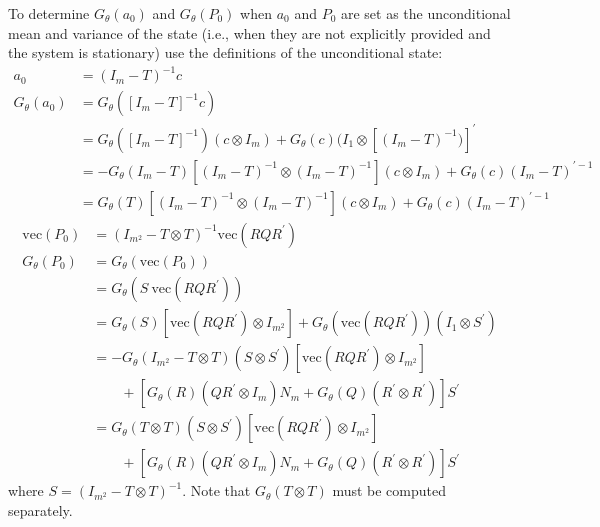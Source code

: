 \documentclass[12pt]{article}
\newcommand{\Gt}{G_\theta}
\newcommand{\vecop}[0]{\text{vec}}
\begin{document}
To determine $\Gt(a_0)$ and $\Gt(P_0)$ when $a_0$ and $P_0$ are set as the unconditional mean and variance of the state (i.e., when they are not explicitly provided and the system is stationary) use the definitions of the unconditional state:
\begin{align*}
a_0 &= (I_m - T)^{-1} c \\
\Gt(a_0) &= \Gt([I_m - T]^{-1} c) \\ 
	&= \Gt([I_m - T]^{-1}) (c \otimes I_m) + \Gt(c) (I_1 \otimes [(I_m - T)^{-1})]^\prime \\ 
	&= -\Gt(I_m - T) [(I_m - T)^{-1} \otimes (I_m - T)^{-1} ](c \otimes I_m) +  \Gt(c) (I_m - T)^{\prime-1} \\ 
	&= \Gt(T) [(I_m - T)^{-1} \otimes (I_m - T)^{-1}] (c \otimes I_m) +  \Gt(c) (I_m - T)^{\prime-1} 
\end{align*}
\begin{align*}
\vecop(P_0) &= (I_{m^2} - T \otimes T)^{-1} \vecop(RQR^\prime) \\ 
\Gt(P_0) &= \Gt(\vecop(P_0)) \\
	&= \Gt(S \ \vecop(RQR^\prime))\\
	&= \Gt(S) [\vecop(RQR^\prime) \otimes I_{m^2}] + \Gt(\vecop(RQR^\prime))(I_1 \otimes S^\prime) \\
	&= -\Gt(I_{m^2} - T \otimes T)(S \otimes S^\prime) [\vecop(RQR^\prime) \otimes I_{m^2}]\\ 
	&\qquad + [\Gt(R)(QR^\prime \otimes I_m) N_m + \Gt(Q)(R^\prime \otimes R^\prime)] S^\prime \\
	&= \Gt(T \otimes T)(S \otimes S^\prime) [\vecop(RQR^\prime) \otimes I_{m^2}] \\
	&\qquad + [\Gt(R)(QR^\prime \otimes I_m) N_m + \Gt(Q)(R^\prime \otimes R^\prime)] S^\prime
\end{align*}
where $S = (I_{m^2} - T \otimes T)^{-1}$. Note that $\Gt(T \otimes T)$ must be computed separately.


\end{document}
